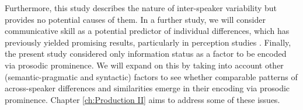 Furthermore, this study describes the nature of inter-speaker variability but provides no potential causes of them. In a further study, we will consider communicative skill as a potential predictor of individual differences, which has previously yielded promising results, particularly in perception studies \citep{bishopPhonologyPhoneticsSignalextrinsic2020, orricoInfluenceEmpathyAutisticlike2023}. Finally, the present study considered only information status as a factor to be encoded via prosodic prominence. We will expand on this by taking into account other (semantic-pragmatic and syntactic) factors to see whether comparable patterns of across-speaker differences and similarities emerge in their encoding via prosodic prominence. Chapter \ref{ch:Production II} aims to address some of these issues.
